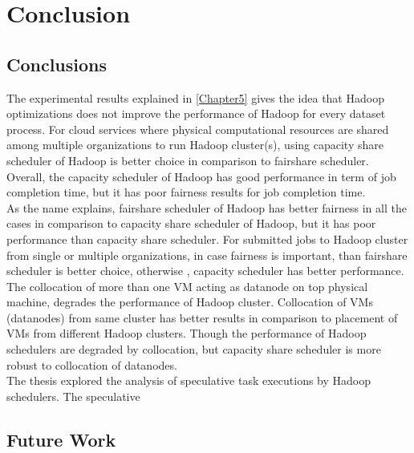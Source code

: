 
\chapter{Conclusion} %

\label{Chapter7} %



\section{Conclusions}
 
 
 The experimental results explained in \ref{Chapter5} gives the idea that Hadoop optimizations does not improve the performance of Hadoop for every dataset process. For cloud services where physical computational resources are shared among multiple organizations to run Hadoop cluster(s), using capacity share scheduler of Hadoop is better choice in comparison to fairshare scheduler. Overall, the capacity scheduler of Hadoop has good performance in term of job completion time, but it has poor fairness results for job completion time. \\
 
 As the name explains, fairshare scheduler of Hadoop has better fairness in all the cases in comparison to capacity share scheduler of Hadoop, but it has poor performance than capacity share scheduler. For submitted jobs to Hadoop cluster from single or multiple organizations, in case fairness is important, than fairshare scheduler is better choice, otherwise , capacity scheduler has better performance. \\
 
 The collocation of more than one VM acting as datanode on top physical machine, degrades the performance  of Hadoop cluster. Collocation of VMs (datanodes)‌ from same cluster has better results in comparison to placement of VMs from different Hadoop clusters. Though the performance of Hadoop schedulers are degraded by collocation, but capacity share scheduler is more robust to collocation of datanodes.\\
 
 The thesis explored the analysis of speculative task executions by Hadoop schedulers. The speculative  

\section{Future Work}




